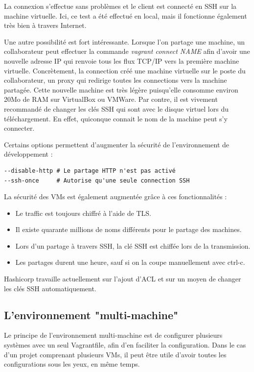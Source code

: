 \documentclass[12pt,a4paper]{article}
\begin{document}
La connexion s'effectue sans problèmes et le client est connecté en SSH sur la machine virtuelle. Ici, ce test a été effectué en local, mais il fonctionne également très bien à travers Internet.

Une autre possibilité est fort intéressante. Lorsque l'on partage une machine, un collaborateur peut effectuer la commande \textit{vagrant connect NAME} afin d'avoir une nouvelle adresse IP qui renvoie tous les flux TCP/IP vers la première machine virtuelle. Concrètement, la connection créé une machine virtuelle sur le poste du collaborateur, un proxy qui redirige toutes les connections vers la machine partagée. Cette nouvelle machine est très légère puisqu'elle consomme environ 20Mo de RAM sur VirtualBox ou VMWare. Par contre, il est vivement recommandé de changer les clés SSH qui sont avec le disque virtuel lors du téléchargement. En effet, quiconque connait le nom de la machine peut s'y connecter. 

Certains options permettent d'augmenter la sécurité de l'environnement de développement :
\begin{lstlisting}
--disable-http # Le partage HTTP n'est pas activé
--ssh-once     # Autorise qu'une seule connection SSH
\end{lstlisting}
La sécurité des VMs est également augmentée grâce à ces fonctionnalités :
\begin{itemize}
	\item{Le traffic est toujours chiffré à l'aide de TLS.}
	\item{Il existe quarante millions de noms différents pour le partage des machines.}
	\item{Lors d'un partage à travers SSH, la clé SSH est chiffée lors de la transmission.}
	\item{Les partages durent une heure, sauf si on la coupe manuellement avec ctrl-c.}
\end{itemize}

Hashicorp travaille actuellement sur l'ajout d'ACL et sur un moyen de changer les clés SSH automatiquement.	

\subsection{L'environnement "multi-machine"}
Le principe de l'environnement multi-machine est de configurer plusieurs systèmes avec un seul Vagrantfile, afin d'en faciliter la configuration. Dans le cas d'un projet comprenant plusieurs VMs, il peut être utile d'avoir toutes les configurations sous les yeux, en même temps.
\end{document}
